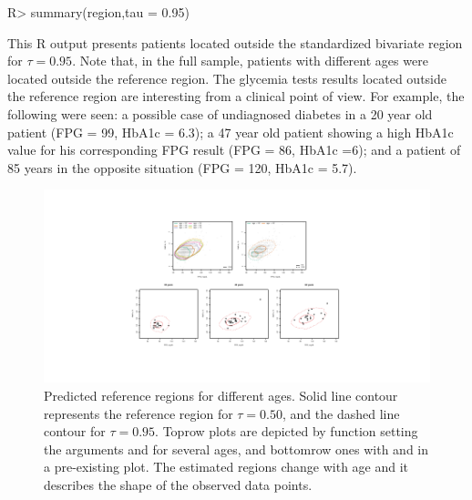 \begin{example}
R> summary(region,tau = 0.95)
\end{example}

This R output presents patients located outside the standardized bivariate region for $\tau = 0.95$. Note that, in the full sample, patients with different ages were located outside the reference region. The glycemia tests results located outside the reference region are interesting from a clinical point of view. For example, the following were seen: a possible case of undiagnosed diabetes in a 20 year old patient (FPG = 99, HbA1c = 6.3); a 47 year old patient showing a high HbA1c value for his corresponding FPG result (FPG = 86, HbA1c =6); and a patient of 85 years in the opposite situation (FPG = 120, HbA1c = 5.7).


\begin{figure}[!htb]
	\centering
	\includegraphics[width = \textwidth]{Fig4.pdf}
	\caption{Predicted reference regions for different ages. Solid line contour represents the reference region for $\tau = 0.50$, and the dashed line contour for $\tau = 0.95$. Toprow plots are depicted by  function setting the arguments  and  for several ages, and bottomrow ones with  and  in a pre-existing plot. The estimated regions change with age and it describes the shape of the observed data points.}
\end{figure}

